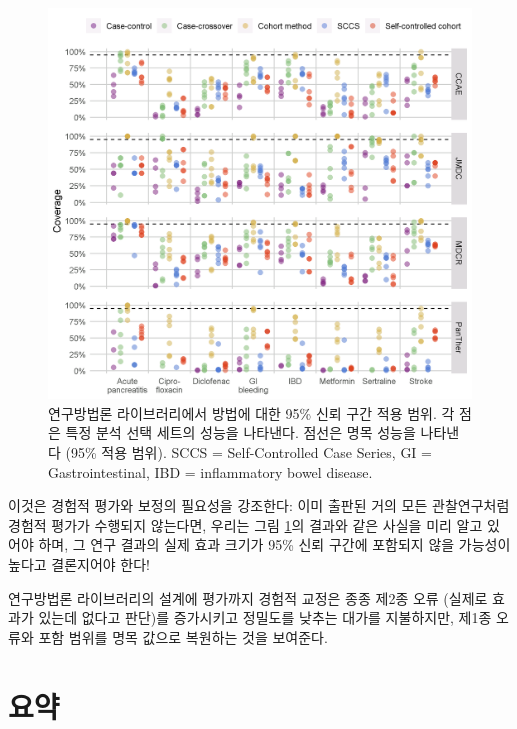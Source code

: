 \documentclass[10.5pt]{book}
\theoremstyle{definition}
\theoremstyle{definition}
\theoremstyle{definition}
\theoremstyle{remark}
\begin{document}
\begin{figure}[h]

{\centering \includegraphics[width=1\linewidth]{images/MethodValidity/methodEval} 

}

\caption{연구방법론 라이브러리에서 방법에 대한 95\% 신뢰 구간 적용 범위. 각 점은 특정 분석 선택 세트의 성능을 나타낸다. 점선은 명목 성능을 나타낸다 (95\% 적용 범위). SCCS = Self-Controlled Case Series, GI = Gastrointestinal, IBD = inflammatory bowel disease.}\label{fig:methodEval}
\end{figure}

이것은 경험적 평가와 보정의 필요성을 강조한다: 이미 출판된 거의 모든
관찰연구처럼 경험적 평가가 수행되지 않는다면, 우리는 그림
\ref{fig:methodEval}의 결과와 같은 사실을 미리 알고 있어야 하며, 그 연구
결과의 실제 효과 크기가 95\% 신뢰 구간에 포함되지 않을 가능성이 높다고
결론지어야 한다!

연구방법론 라이브러리의 설계에 평가까지 경험적 교정은 종종 제2종 오류
(실제로 효과가 있는데 없다고 판단)를 증가시키고 정밀도를 낮추는 대가를
지불하지만, 제1종 오류와 포함 범위를 명목 값으로 복원하는 것을 보여준다.

\section{요약}\label{-16}
\end{document}
